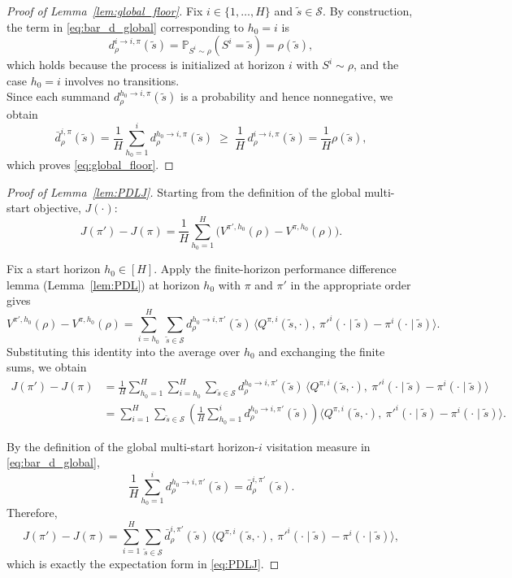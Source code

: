 \documentclass[11pt]{article}
\begin{document}
\begin{proof}  [Proof of Lemma~\ref{lem:global_floor}]
Fix $i\in\{1,\dots,H\}$ and $\tilde{s}\in\mathcal S$.
By construction, the term in \eqref{eq:bar_d_global} corresponding to $h_0=i$ is
\[
d^{i\to i,\pi}_\rho(\tilde{s})
=
\mathbb P_{S^i\sim\rho}(S^i=\tilde{s})
=
\rho(\tilde{s}),
\]
which holds because the process is initialized at horizon $i$ with $S^i\sim\rho$, and the case $h_0=i$ involves no transitions.\\
Since each summand $d^{h_0\to i,\pi}_\rho(\tilde{s})$ is a probability and hence nonnegative, we obtain
\[
\bar d^{i,\pi}_\rho(\tilde{s})
=
\frac{1}{H}\sum_{h_0=1}^{i} d^{h_0\to i,\pi}_\rho(\tilde{s})
\;\ge\;
\frac{1}{H}\, d^{i\to i,\pi}_\rho(\tilde{s})
=
\frac{1}{H}\rho(\tilde{s}),
\]
which proves \eqref{eq:global_floor}.
\end{proof}

\begin{proof}[Proof of Lemma~\ref{lem:PDLJ}]
Starting from the definition of the global multi-start objective, $J(\cdot)$:
\[
J(\pi')-J(\pi)
=
\frac{1}{H}\sum_{h_0=1}^H\Big(V^{\pi',h_0}(\rho)-V^{\pi,h_0}(\rho)\Big).
\]

Fix a start horizon $h_0\in[H]$. Apply the finite-horizon performance difference lemma (Lemma~\ref{lem:PDL}) at horizon $h_0$ with $\pi$ and $\pi'$ in the appropriate order gives 
\[
V^{\pi',h_0}(\rho)-V^{\pi,h_0}(\rho)
=
\sum_{i=h_0}^H\ \sum_{\tilde{s}\in\mathcal S}
d^{h_0\to i,\pi'}_\rho(\tilde{s})\,
\Big\langle Q^{\pi,i}(\tilde{s},\cdot),\ \pi'^i(\cdot\mid \tilde{s})-\pi^i(\cdot\mid \tilde{s})\Big\rangle.
\]
Substituting this identity into the average over $h_0$ and exchanging the finite sums, we obtain
\begin{align*}
J(\pi')-J(\pi)
&=
\frac{1}{H}\sum_{h_0=1}^H \sum_{i=h_0}^H \sum_{\tilde{s}\in\mathcal S}
d^{h_0\to i,\pi'}_\rho(\tilde{s})\,
\Big\langle Q^{\pi,i}(\tilde{s},\cdot),\ \pi'^i(\cdot\mid \tilde{s})-\pi^i(\cdot\mid \tilde{s})\Big\rangle \\
&=
\sum_{i=1}^H \sum_{\tilde{s}\in\mathcal S}
\left(\frac{1}{H}\sum_{h_0=1}^i d^{h_0\to i,\pi'}_\rho(\tilde{s})\right)
\Big\langle Q^{\pi,i}(\tilde{s},\cdot),\ \pi'^i(\cdot\mid \tilde{s})-\pi^i(\cdot\mid \tilde{s})\Big\rangle.
\end{align*}

By the definition of the global multi-start horizon-$i$ visitation measure in \eqref{eq:bar_d_global},
\[
\frac{1}{H}\sum_{h_0=1}^i d^{h_0\to i,\pi'}_\rho(\tilde s)
=
\bar d^{i,\pi'}_\rho(\tilde s).
\]
Therefore,
\[
J(\pi')-J(\pi)
=
\sum_{i=1}^H \sum_{\tilde s\in\mathcal S}
\bar d^{i,\pi'}_\rho(\tilde s)\,
\Big\langle Q^{\pi,i}(\tilde s,\cdot),\ \pi'^i(\cdot\mid \tilde s)-\pi^i(\cdot\mid \tilde s)\Big\rangle,
\]
which is exactly the expectation form in \eqref{eq:PDLJ}.
\end{proof}
\end{document}

